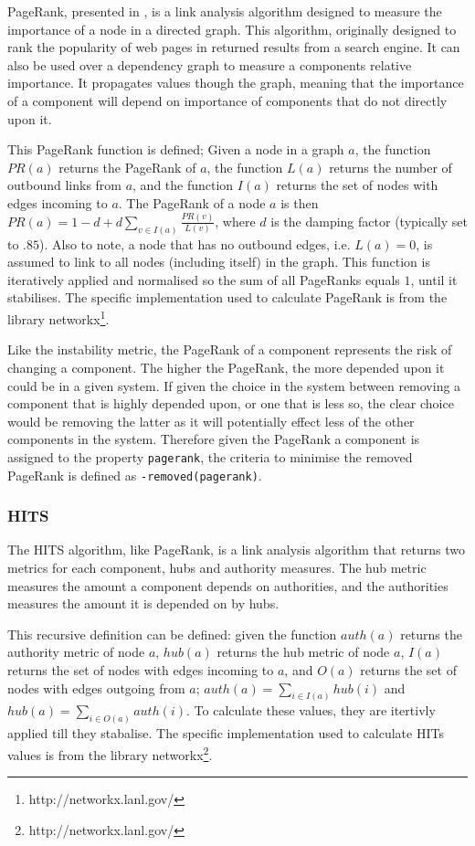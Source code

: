 PageRank, presented in \cite{page1998}, is a link analysis algorithm designed to measure the importance of a node in a directed graph.
This algorithm, originally designed to rank the popularity of web pages in returned results from a search engine.
It can also be used over a dependency graph to measure a components relative importance.
It propagates values though the graph, meaning that the importance of a component will depend on importance of components that do not directly upon it. 

This PageRank function is defined;
Given a node in a graph $a$, the function $PR(a)$ returns the PageRank of $a$, 
the function $L(a)$ returns the number of outbound links from $a$, 
and the function $I(a)$ returns the set of nodes with edges incoming to $a$.
The PageRank of a node $a$ is then $PR(a) = 1-d + d\sum\limits_{v \in I(a)} \frac{PR(v)}{L(v)}$,
where $d$ is the damping factor (typically set to $.85$).
Also to note, a node that has no outbound edges, i.e. $L(a) = 0$, is assumed to link to all nodes (including itself) in the graph.
This function is iteratively applied and normalised so the sum of all PageRanks equals $1$, until it stabilises.
The specific implementation used to calculate PageRank is from the library networkx\footnote{http://networkx.lanl.gov/}.

Like the instability metric, the PageRank of a component represents the risk of changing a component.
The higher the PageRank, the more depended upon it could be in a given system.
If given the choice in the system between removing a component that is highly depended upon, or one that is less so,
the clear choice would be removing the latter as it will potentially effect less of the other components in the system.
Therefore given the PageRank a component is assigned to the property \verb+pagerank+, the criteria to minimise the removed PageRank is defined as \verb!-removed(pagerank)!.


\subsubsection{HITS}
The HITS algorithm, like PageRank, is a link analysis algorithm that returns two metrics for each component, hubs and authority measures.
The hub metric measures the amount a component depends on authorities, and the authorities measures the amount it is depended on by hubs.

This recursive definition can be defined:
given the function $auth(a)$ returns the authority metric of node $a$, $hub(a)$ returns the hub metric of node $a$,
$I(a)$ returns the set of nodes with edges incoming to $a$, and $O(a)$ returns the set of nodes with edges outgoing from $a$;
$auth(a) = \sum \limits_{i \in I(a)} hub(i)$ and  $hub(a) = \sum \limits_{i \in O(a)} auth(i)$.
To calculate these values, they are itertivly applied till they stabalise.
The specific implementation used to calculate HITs values is from the library networkx\footnote{http://networkx.lanl.gov/}.


